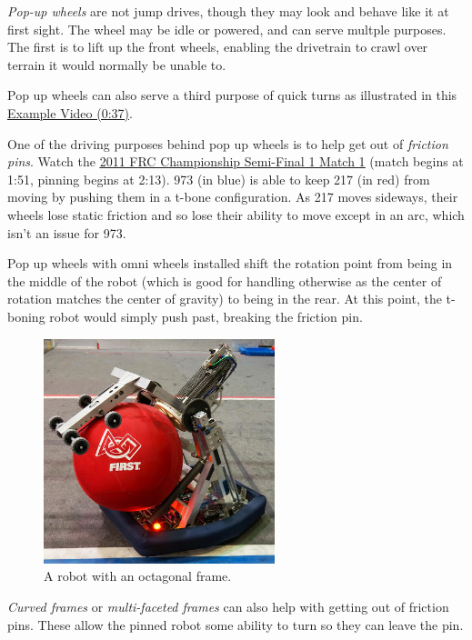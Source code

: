 \documentclass[10pt,letterpaper]{book}
\begin{document}
\textit{Pop-up wheels} are not jump drives, though they may look and behave like it at first sight. The wheel may be idle or powered, and can serve multple purposes. The first is to lift up the front wheels, enabling the drivetrain to crawl over terrain it would normally be unable to.

Pop up wheels can also serve a third purpose of quick turns as illustrated in this \href{https://youtu.be/PtRewwr59d8?t=37}{\color{red}\underline{Example Video (0:37)}}.

One of the driving purposes behind pop up wheels is to help get out of \textit{friction pins}. Watch the \href{https://youtu.be/kLAkcn6l9v0?t=133}{\color{red}\underline{2011 FRC Championship Semi-Final 1 Match 1}} (match begins at 1:51, pinning begins at 2:13). 973 (in blue) is able to keep 217 (in red) from moving by pushing them in a t-bone configuration. As 217 moves sideways, their wheels lose static friction and so lose their ability to move except in an arc, which isn't an issue for 973.

Pop up wheels with omni wheels installed shift the rotation point from being in the middle of the robot (which is good for handling otherwise as the center of rotation matches the center of gravity) to being in the rear. At this point, the t-boning robot would simply push past, breaking the friction pin.

\begin{figure}[H]
	\includegraphics[width=0.6\textwidth]{imgs/drivetrain_octagon.png}
	\caption{A robot with an octagonal frame.}
\end{figure}

\textit{Curved frames} or \textit{multi-faceted frames} can also help with getting out of friction pins. These allow the pinned robot some ability to turn so they can leave the pin.
\end{document}

